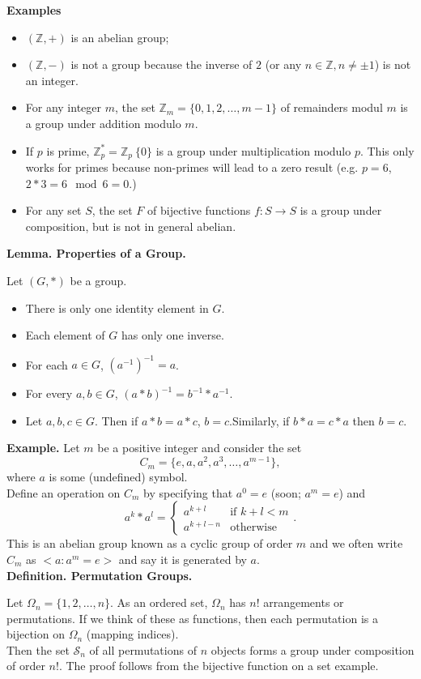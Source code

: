 \documentclass{article}
\newcommand{\definition}[2]{\textbf{Definition. #1.}\begin{adjustwidth}{1cm}{1cm}#2\end{adjustwidth}}
\newcommand{\lemma}[2]{\textbf{Lemma. #1.}\begin{adjustwidth}{1cm}{1cm}#2\end{adjustwidth}}
\begin{document}
\textbf{Examples}\begin{itemize}
  \item $(\mathbb{Z}, +)$ is an abelian group;
  \item $(\mathbb{Z}, -)$ is not a group because the inverse of $2$ (or any $n \in \mathbb{Z}, n \neq \pm 1$) is not an integer.
  \item For any integer $m$, the set $\mathbb{Z}_m = \{0, 1, 2, \ldots, m-1\}$ of remainders modul $m$ is a group under addition modulo $m$.
  \item If $p$ is prime, $\mathbb{Z}^*_p = \mathbb{Z}_p \ \{0\}$ is a group under multiplication modulo $p$. This only works for primes because non-primes will lead to a zero result (e.g. $p = 6$, $2 * 3 = 6 \mod 6 = 0$.)
  \item For any set $S$, the set $F$ of bijective functions $f : S \rightarrow S$ is a group under composition, but is not in general abelian.
\end{itemize}
\lemma{Properties of a Group}{Let $(G, *)$ be a group.\begin{itemize}\item There is only one identity element in $G$.\item Each element of $G$ has only one inverse. \item For each $a \in G$, $(a^{-1})^{-1} = a$. \item For every $a,b \in G$, $(a * b)^{-1} = b^{-1} * a^{-1}$. \item Let $a,b,c \in G$. Then if $a * b = a * c$, $b = c$.Similarly, if $b * a = c * a$ then $b = c$.\end{itemize}}
\textbf{Example.}
Let $m$ be a positive integer and consider the set \[C_m = \{e, a, a^2, a^3, \ldots, a^{m-1}\},\]where $a$ is some (undefined) symbol.\\Define an operation on $C_m$ by specifying that $a^0 = e$ (soon; $a^m = e$) and \[a^k * a^l = \begin{cases}
  a^{k+l} & \text{if } k + l < m\\
  a^{k+l-n} & \text{otherwise}
\end{cases}.\]This is an abelian group known as a cyclic group of order $m$ and we often write $C_m$ as $<a: a^m = e>$ and say it is generated by $a$. \\[1\baselineskip]
\definition{Permutation Groups}{Let $\Omega_n = \{1, 2, \ldots,n\}$. As an ordered set, $\Omega_n$ has $n!$ arrangements or permutations. If we think of these as functions, then each permutation is a bijection on $\Omega_n$ (mapping indices).\\[1\baselineskip]Then the set $\mathcal{S}_n$ of all permutations of $n$ objects forms a group under composition of order $n!$. The proof follows from the bijective function on a set example.}~\\
\end{document}
